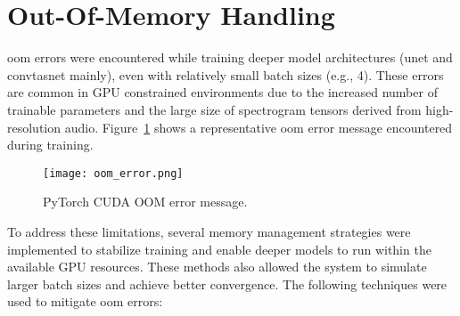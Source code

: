 \section{Out-Of-Memory Handling}
\label{sec:oom_handling}

\gls{oom} errors were encountered while training deeper model architectures (\gls{unet} and \gls{convtasnet} mainly), even with relatively small batch sizes (e.g., 4). These errors are common in GPU constrained environments due to the increased number of trainable parameters and the large size of spectrogram tensors derived from high-resolution audio. Figure~\ref{fig:oom_error} shows a representative \gls{oom} error message encountered during training.

\begin{figure}[H]
    \centering
    \texttt{[image: oom\_error.png]}
    \caption{\label{fig:oom_error} PyTorch CUDA OOM error message.}
\end{figure}

To address these limitations, several memory management strategies were implemented to stabilize training and enable deeper models to run within the available GPU resources. These methods also allowed the system to simulate larger batch sizes and achieve better convergence. The following techniques were used to mitigate \gls{oom} errors:

